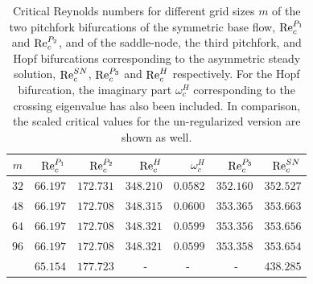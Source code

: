\begin{table}[h!]
  \centering
  \caption{Critical Reynolds numbers for different grid sizes $m$ of the two
    pitchfork bifurcations of the symmetric base flow, $\mathrm{Re}_c^{P_1}$ and
    $\mathrm{Re}_c^{P_2}$, and of the saddle-node, the third pitchfork, and Hopf
    bifurcations corresponding to the asymmetric steady solution,
    $\mathrm{Re}_c^{SN}$, $\mathrm{Re}_c^{P_3}$ and $\mathrm{Re}_c^{H}$ respectively. For the Hopf
    bifurcation, the imaginary part $\omega_c^{H}$ corresponding to the
    crossing eigenvalue has also been included. In comparison, the scaled
    critical values for the un-regularized version are shown as well.}
  \label{tab:re_crit}
\begin{tabular}{crrrrrr}
$m$ & $\mathrm{Re}_c^{P_1}$ & $\mathrm{Re}_c^{P_2}$ & $\mathrm{Re}_c^{H}$ &  $\omega_c^{H}$ & $\mathrm{Re}_c^{P_3}$ & $\mathrm{Re}_c^{SN}$  \\
\hline
$32$ & $66.197$ & $172.731$ & $348.210$ & $0.0582$ & $352.160$ & $352.527$ \\
$48$ & $66.197$ & $172.708$ & $348.315$ & $0.0600$ & $353.365$ & $353.663$ \\
$64$ & $66.197$ & $172.708$ & $348.321$ & $0.0599$ & $353.356$ & $353.656$ \\
$96$ & $66.197$ & $172.708$ & $348.321$ & $0.0599$ & $353.358$ & $353.654$ \\
\citet{chen2013} & $65.154$ & $177.723$ & - $\quad$ & - $\quad$ & - $\quad$ & $438.285$ \\
\end{tabular}
\end{table}

